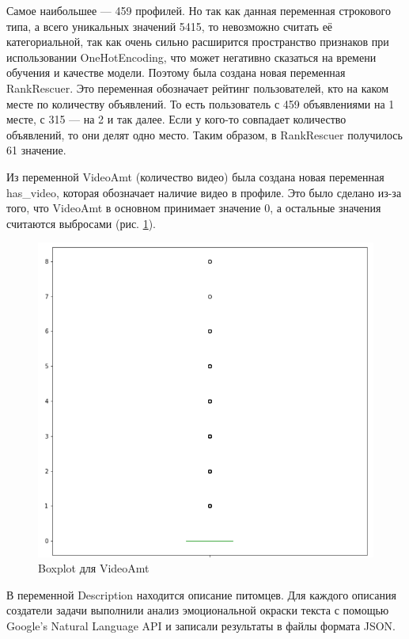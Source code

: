 \documentclass[14pt]{mmcs_article}
\begin{document}
Самое наибольшее --- 459 профилей. Но так как данная переменная строкового типа, а всего уникальных значений 5415, то невозможно считать её категориальной, так как очень сильно расширится пространство признаков при использовании OneHotEncoding, что может негативно сказаться на времени обучения и качестве модели. Поэтому была создана новая переменная RankRescuer. Это переменная обозначает рейтинг пользователей, кто на каком месте по количеству объявлений. То есть пользователь с 459 объявлениями на 1 месте, с 315 --- на 2 и так далее. Если у кого-то совпадает количество объявлений, то они делят одно место. Таким образом, в RankRescuer получилось 61 значение.

Из переменной VideoAmt (количество видео) была создана новая переменная has\_video, которая обозначает наличие видео в профиле. Это было сделано из-за того, что VideoAmt в основном принимает значение 0, а остальные значения считаются выбросами (рис. \ref{analyse:videooutlier}).

\begin{figure}[H]
	\centering
	\includegraphics[scale=0.6]{videooutlier.png}
	\caption{Boxplot для VideoAmt}\label{analyse:videooutlier}
\end{figure}

В переменной Description находится описание питомцев. Для каждого описания создатели задачи выполнили анализ эмоциональной окраски текста с помощью Google’s Natural Language API и записали результаты в файлы формата JSON. 
\end{document}
